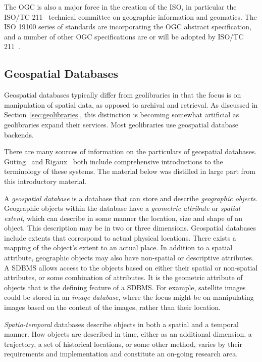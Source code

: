 \documentclass{ucdthesis}       %
\begin{document}
The \ac{OGC} is also a major force in the creation of the \acf{ISO},
in particular the ISO/TC 211~\cite{iso-tc} technical committee on
geographic information and geomatics.  The \ac{ISO} 19100 series of
standards are incorporating the \ac{OGC} abstract specification, and a
number of other \ac{OGC} specifications are or will be adopted by
\ac{ISO}/TC 211~\cite{wiki06}.


\subsection{Geospatial Databases}

Geospatial databases typically differ from geolibraries in that the
focus is on manipulation of spatial data, as opposed to
archival and retrieval.  As discussed in
Section~\ref{sec:geolibraries}, this distinction is becoming somewhat
artificial as geolibraries expand their services.  Most geolibraries
use geospatial database backends.

There are many sources of information on the particulars of
geospatial databases.  G\"uting~\cite{gutin94introd-spatial} and
Rigaux~\cite{rigaux02spatial-datab} both include comprehensive
introductions to the terminology of these systems.  The
material below was distilled in large part from this introductory
material.  

A \emph{geospatial database} is a database that can store and describe
\emph{geographic objects}.  Geographic objects within the database
have a \emph{geometric attribute} or \emph{spatial extent}, which can
describe in some manner the location, size and shape of an object.
This description may be in two or three dimensions.  Geospatial
databases include extents that correspond to actual physical
locations.  There exists a mapping of the object's extent to an actual
place.  In addition to a spatial attribute, geographic objects may
also have non-spatial or descriptive attributes.  A \acf{SDBMS} allows
access to the objects based on either their spatial or non-spatial
attributes, or some combination of attributes.  It is the geometric
attribute of objects that is the defining feature of a \ac{SDBMS}.
For example, satellite images could be stored in an \emph{image
  database}, where the focus might be on manipulating images based on
the content of the images, rather than their location.

\emph{Spatio-temporal} databases describe objects in both a spatial
and a temporal manner.  How objects are described in time, either as
an additional dimension, a trajectory, a set of historical locations,
or some other method, varies by their requirements and implementation
and constitute an on-going research area.
\end{document}
